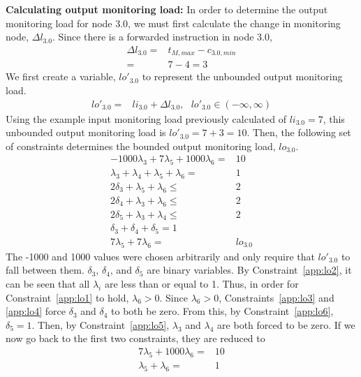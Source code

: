 {\bf Calculating output monitoring load:}
In order to determine the output monitoring load for node 3.0, we must first
calculate the change in monitoring node, $\Delta l_{3.0}$. Since there is a
forwarded instruction in node 3.0,
\begin{align*}
  \Delta l_{3.0} =& t_{M, max} - c_{3.0, min} \\
  =& 7 - 4 = 3
\end{align*}
We first create a variable, $lo'_{3.0}$ to represent the unbounded output
monitoring load.
\begin{align*}
  lo'_{3.0} =& li_{3.0} + \Delta l_{3.0}, \text{ } lo'_{3.0} \in (-\infty, \infty)
\end{align*}
Using the example input monitoring load previously calculated of $li_{3.0} =
7$, this unbounded output monitoring load is $lo'_{3.0} = 7 + 3 = 10$.  Then,
the following set of constraints determines the bounded output monitoring load,
$lo_{3.0}$.
\begin{subequations}
\begin{align}
  -1000\lambda_3 + 7\lambda_5 + 1000\lambda_6 =& 10 \label{app:lo1}\\ 
  \lambda_3 + \lambda_4 + \lambda_5 + \lambda_6 =& 1 \label{app:lo2}\\
  2 \delta_3 + \lambda_5 + \lambda_6 \leq& 2 \label{app:lo3}\\
  2 \delta_4 + \lambda_3 + \lambda_6 \leq& 2 \label{app:lo4}\\
  2 \delta_5 + \lambda_3 + \lambda_4 \leq& 2 \label{app:lo5}\\
  \delta_3 + \delta_4 + \delta_5 = 1 \label{app:lo6}\\
  7\lambda_5 + 7\lambda_6 =& lo_{3.0} \label{app:lo7}
\end{align}
\end{subequations}
The -1000 and 1000 values were chosen arbitrarily and only require that
$lo'_{3.0}$ to fall between them. $\delta_3$, $\delta_4$, and $\delta_5$ are
binary variables. By Constraint~\ref{app:lo2}, it can be seen that all
$\lambda_i$ are less than or equal to 1. Thus, in order for
Constraint~\ref{app:lo1} to hold, $\lambda_6 >  0$. Since $\lambda_6 > 0$,
Constraints~\ref{app:lo3} and \ref{app:lo4} force $\delta_3$ and $\delta_4$ to
both be zero. From this, by Constraint~\ref{app:lo6}, $\delta_5 = 1$. Then, by
Constraint~\ref{app:lo5}, $\lambda_3$ and $\lambda_4$ are both forced to be
zero. If we now go back to the first two constraints, they are reduced to
\begin{align*}
  7\lambda_5 + 1000\lambda_6 =& 10\\
  \lambda_5 + \lambda_6 =& 1 \\
\end{align*}
